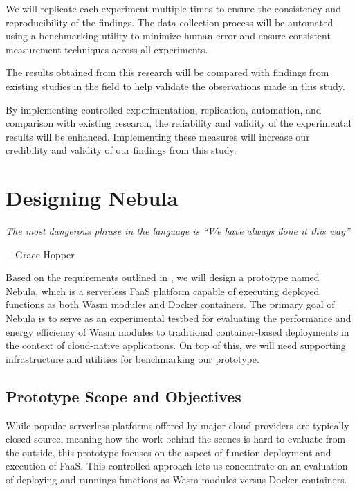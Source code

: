 \documentclass[
  table]{report}
\begin{document}
We will replicate each experiment multiple times to ensure the
consistency and reproducibility of the findings. The data collection
process will be automated using a benchmarking utility to minimize human
error and ensure consistent measurement techniques across all
experiments.

The results obtained from this research will be compared with findings
from existing studies in the field to help validate the observations
made in this study.

By implementing controlled experimentation, replication, automation, and
comparison with existing research, the reliability and validity of the
experimental results will be enhanced. Implementing these measures will
increase our credibility and validity of our findings from this study.

\newpage

\chapter{Designing Nebula}
\label{chap:design}

\setlength{} 
\epigraph{\itshape 
The most dangerous phrase in the language is ``We have always done it this way''
}{---Grace Hopper}

Based on the requirements outlined in , we will
design a prototype named Nebula, which is a serverless \ac{FaaS}
platform capable of executing deployed functions as both \ac{Wasm}
modules and Docker containers. The primary goal of Nebula is to serve as
an experimental testbed for evaluating the performance and energy
efficiency of \ac{Wasm} modules to traditional container-based
deployments in the context of cloud-native applications. On top of this,
we will need supporting infrastructure and utilities for benchmarking
our prototype.

\section{Prototype Scope and Objectives}
\label{sect:prototype_scope}

While popular serverless platforms offered by major cloud providers are
typically closed-source, meaning how the work behind the scenes is hard
to evaluate from the outside, this prototype focuses on the aspect of
function deployment and execution of \ac{FaaS}. This controlled approach
lets us concentrate on an evaluation of deploying and runnings functions
as \ac{Wasm} modules versus Docker containers.
\end{document}
